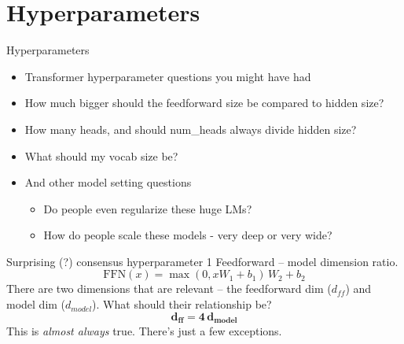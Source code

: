 \section{Hyperparameters}

\begin{frame}{Hyperparameters}
\begin{itemize}
  \item Transformer hyperparameter questions you might have had
  \item How much bigger should the feedforward size be compared to hidden size?
  \item How many heads, and should num\_heads always divide hidden size?
  \item What should my vocab size be?
  \item And other model setting questions
  \begin{itemize}
    \item Do people even regularize these huge LMs?
    \item How do people scale these models - very deep or very wide?
  \end{itemize}
\end{itemize}
\end{frame}

\begin{frame}{Surprising (?) consensus hyperparameter 1}
Feedforward -- model dimension ratio.
\[ \text{FFN}(x) = \max(0, xW_1 + b_1)\,W_2 + b_2 \]
There are two dimensions that are relevant -- the feedforward dim ($d_{ff}$) and model dim ($d_{model}$). What should their relationship be?
\[ \boldsymbol{d_{ff} = 4\, d_{model}} \]
This is \emph{almost always} true. There's just a few exceptions.
\end{frame}

